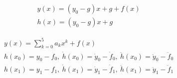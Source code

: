 \begin{equation}
    \label{formula:vmp_elementary_trajectory_linear_velocity}
    \begin{matrix}
        y(x)=\left(y_0-g\right) x+g+f(x) \\
        h(x) = (y_{0} - g)x + g
        \end{matrix}
\end{equation}

\begin{equation}
    \label{formula:vmp_elementary_minimum_jerk}
    \begin{matrix}
        y(x)=\sum_{k=0}^{5} a_k x^k + f(x) \\
        h(x_0) = y_0 - f_0,\ \dot{h}(x_0) = \dot{y}_0 - \dot{f}_0,\ \ddot{h}(x_0) = \ddot{y}_0 - \ddot{f}_0 \\
        h(x_1) = y_1 - f_1,\ \dot{h}(x_1) = \dot{y}_1 - \dot{f}_1,\ \ddot{h}(x_1) = \ddot{y}_1 - \ddot{f}_1
        \end{matrix}
\end{equation}